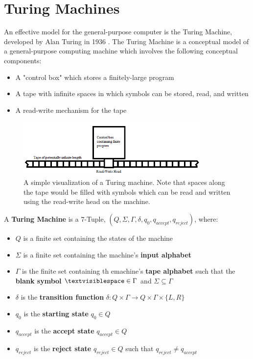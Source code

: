 \documentclass{article}
\begin{document}
\section{Turing Machines}
An effective model for the general-purpose computer is the Turing Machine, developed by Alan Turing in 1936 \cite{2}.  The Turing Machine is a conceptual model of a general-purpose computing machine which involves the following conceptual components:
\begin{itemize}
	\item A "control box" which stores a finitely-large program
	\item A tape with infinite spaces in which symbols can be stored, read, and written
	\item A read-write mechanism for the tape \cite{3}
\end{itemize}
\begin{figure}[h]
	\includegraphics[width=0.85\textwidth]{figure-3-1}
	\centering
	\setlength{\belowcaptionskip}{-10pt}
	\caption{A simple visualization of a Turing machine.  Note that spaces along the tape would be filled with symbols which can be read and written using the read-write head on the machine.}
\end{figure}
\begin{defin}
	A \textbf{Turing Machine} is a 7-Tuple, $(Q, \Sigma, \Gamma, \delta, q_{0}, q_{accept}, q_{reject})$, where:
\end{defin}
\begin{itemize}
	\item $Q$ is a finite set containing the states of the machine
	\item $\Sigma$ is a finite set containing the machine's \textbf{input alphabet}
	\item $\Gamma$ is the finite set containing th emachine's \textbf{tape alphabet} such that the \textbf{blank symbol} $\textvisiblespace \in \Gamma$ and $\Sigma \subseteq \Gamma$
	\item $\delta$ is the \textbf{transition function} $\delta: Q \times \Gamma \to Q \times \Gamma \times \{L, R\}$
	\item $q_{0}$ is the \textbf{starting state} $q_{0} \in Q$
	\item $q_{accept}$ is the \textbf{accept state} $q_{accept} \in Q$
	\item $q_{reject}$ is the \textbf{reject state} $q_{reject} \in Q$ such that $q_{reject} \neq q_{accept}$ \cite{2}
\end{itemize}
\end{document}
